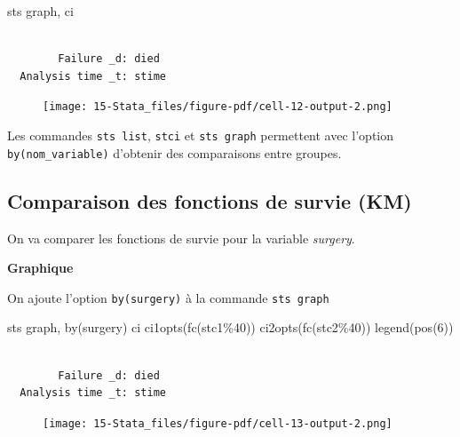 \documentclass[
  12pt,
  letterpaper,
  DIV=11,
  numbers=noendperiod,
  onepage,
  openany]{scrreprt}
\newenvironment{Shaded}{\begin{snugshade}}{\end{snugshade}}
\newcommand{\BaseNTok}[1]{\textcolor[rgb]{0.86,0.64,0.64}{#1}}
\newcommand{\KeywordTok}[1]{\textcolor[rgb]{0.94,0.87,0.69}{#1}}
\newcommand{\NormalTok}[1]{\textcolor[rgb]{0.80,0.80,0.80}{#1}}
\begin{document}
\begin{Shaded}
\begin{Highlighting}[]
\KeywordTok{sts} \KeywordTok{graph}\NormalTok{, }\KeywordTok{ci}
\end{Highlighting}
\end{Shaded}

\begin{verbatim}

        Failure _d: died
  Analysis time _t: stime
\end{verbatim}

\begin{figure}[H]

{\centering \texttt{[image: 15-Stata\_files/figure-pdf/cell-12-output-2.png]}

}

\end{figure}

Les commandes \texttt{sts\ list}, \texttt{stci} et \texttt{sts\ graph}
permettent avec l'option \texttt{by(nom\_variable)} d'obtenir des
comparaisons entre groupes.

\hypertarget{comparaison-des-fonctions-de-survie-km}{%
\subsection{Comparaison des fonctions de survie
(KM)}\label{comparaison-des-fonctions-de-survie-km}}

On va comparer les fonctions de survie pour la variable \emph{surgery}.

\textbf{Graphique}

On ajoute l'option \texttt{by(surgery)} à la commande
\texttt{sts\ graph}

\begin{Shaded}
\begin{Highlighting}[]
\KeywordTok{sts} \KeywordTok{graph}\NormalTok{, }\KeywordTok{by}\NormalTok{(surgery) }\KeywordTok{ci}\NormalTok{ ci1opts(fc(stc1\%40))  ci2opts(fc(stc2\%40)) }\BaseNTok{legend}\NormalTok{(pos(6))}
\end{Highlighting}
\end{Shaded}

\begin{verbatim}

        Failure _d: died
  Analysis time _t: stime
\end{verbatim}

\begin{figure}[H]

{\centering \texttt{[image: 15-Stata\_files/figure-pdf/cell-13-output-2.png]}

}

\end{figure}
\end{document}
